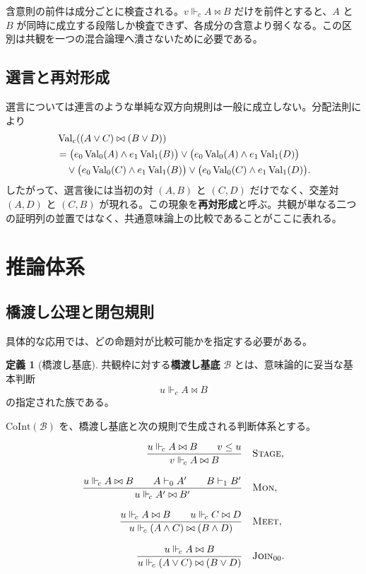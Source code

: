 \documentclass[a4paper,11pt]{ltjsarticle}
\theoremstyle{definition}
\newtheorem{definition}{定義}[section]
\theoremstyle{plain}
\newcommand{\CoInt}{\mathrm{CoInt}}
\newcommand{\Val}{\operatorname{Val}}
\newcommand{\forcesc}{\Vdash_{\!c}}
\begin{document}
含意則の前件は成分ごとに検査される。$v\forcesc A\bowtie B$ だけを前件とすると、$A$ と $B$ が同時に成立する段階しか検査できず、各成分の含意より弱くなる。この区別は共観を一つの混合論理へ潰さないために必要である。

\subsection{選言と再対形成}

選言については連言のような単純な双方向規則は一般に成立しない。分配法則により
\begin{align}
 &\Val_c((A\lor C)\bowtie(B\lor D))\\
 &=\bigl(e_0\Val_0(A)\wedge e_1\Val_1(B)\bigr)
 \lor\bigl(e_0\Val_0(A)\wedge e_1\Val_1(D)\bigr)\notag\\
 &\quad\lor\bigl(e_0\Val_0(C)\wedge e_1\Val_1(B)\bigr)
 \lor\bigl(e_0\Val_0(C)\wedge e_1\Val_1(D)\bigr).
 \label{eq:cross-pairing}
\end{align}
したがって、選言後には当初の対 $(A,B)$ と $(C,D)$ だけでなく、交差対 $(A,D)$ と $(C,B)$ が現れる。この現象を\textbf{再対形成}と呼ぶ。共観が単なる二つの証明列の並置ではなく、共通意味論上の比較であることがここに表れる。

\section{推論体系}

\subsection{橋渡し公理と閉包規則}

具体的な応用では、どの命題対が比較可能かを指定する必要がある。

\begin{definition}[橋渡し基底]
共観枠に対する\textbf{橋渡し基底} $\mathcal B$ とは、意味論的に妥当な基本判断
\[
 u\forcesc A\bowtie B
\]
の指定された族である。
\end{definition}

$\CoInt(\mathcal B)$ を、橋渡し基底と次の規則で生成される判断体系とする。

\begin{align}
\frac{u\forcesc A\bowtie B\qquad v\leq u}
     {v\forcesc A\bowtie B}
&\quad\textsc{Stage},
\label{rule:stage}\\[0.8em]
\frac{u\forcesc A\bowtie B\qquad A\vdash_0 A'\qquad B\vdash_1 B'}
     {u\forcesc A'\bowtie B'}
&\quad\textsc{Mon},
\label{rule:mon}\\[0.8em]
\frac{u\forcesc A\bowtie B\qquad u\forcesc C\bowtie D}
     {u\forcesc(A\land C)\bowtie(B\land D)}
&\quad\textsc{Meet},
\label{rule:meet}\\[0.8em]
\frac{u\forcesc A\bowtie B}
     {u\forcesc(A\lor C)\bowtie(B\lor D)}
&\quad\textsc{Join}_{00}.
\label{rule:join}
\end{align}
\end{document}
